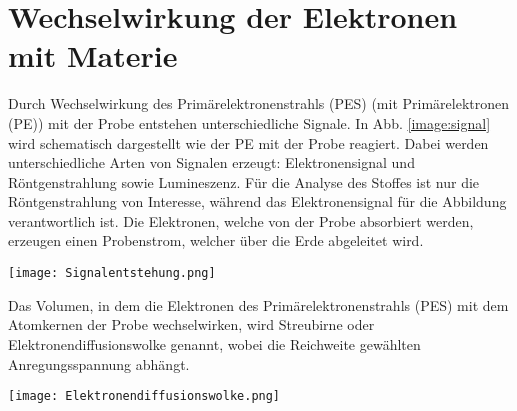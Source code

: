 \section{Wechselwirkung der Elektronen mit Materie}
\label{sec:elektrons}
Durch Wechselwirkung des Primärelektronenstrahls (PES) (mit Primärelektronen (PE)) mit der Probe entstehen unterschiedliche Signale. In Abb. \ref{image:signal} wird schematisch dargestellt wie der PE mit der Probe reagiert. Dabei werden unterschiedliche Arten von Signalen erzeugt: Elektronensignal und Röntgenstrahlung sowie Lumineszenz. Für die Analyse des Stoffes ist nur die Röntgenstrahlung von Interesse, während das Elektronensignal für die Abbildung verantwortlich ist. Die Elektronen, welche von der Probe absorbiert werden, erzeugen einen Probenstrom, welcher über die Erde abgeleitet wird. 
\begin{center}
    \texttt{[image: Signalentstehung.png]}
    \label{image:signal}
\end{center}
Das Volumen, in dem die Elektronen des Primärelektronenstrahls (PES) mit dem Atomkernen der Probe wechselwirken, wird Streubirne oder Elektronendiffusionswolke genannt, wobei die Reichweite gewählten Anregungsspannung abhängt. 
\begin{center}
    \texttt{[image: Elektronendiffusionswolke.png]}
    \label{image:wolke}
\end{center}
\newpage
